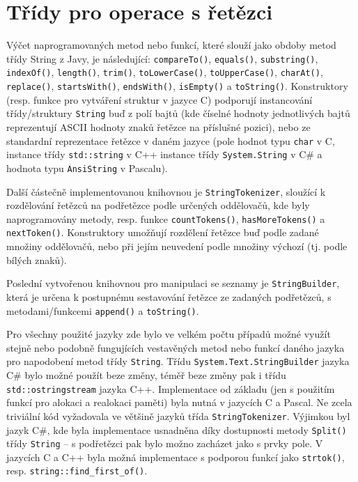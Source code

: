 \documentclass[onepage, a4paper, 12pt]{bakalarka}
\begin{document}
\section{Třídy pro operace s řetězci}
Výčet naprogramovaných metod nebo funkcí, které slouží jako obdoby metod třídy String z Javy, je následující: \texttt{compareTo()}, \texttt{equals()}, \texttt{substring()}, \texttt{indexOf()}, \texttt{length()}, \texttt{trim()}, \texttt{toLowerCase()}, \texttt{toUpperCase()}, \texttt{charAt()}, \texttt{replace()}, \texttt{startsWith()}, \texttt{endsWith()}, \texttt{isEmpty()} a \texttt{toString()}. Konstruktory (resp. funkce pro vytváření struktur v jazyce C) podporují instancování třídy/struktury \texttt{String} buď z polí bajtů (kde číselné hodnoty jednotlivých bajtů reprezentují ASCII hodnoty znaků řetězce na příslušné pozici), nebo ze standardní reprezentace řetězce v daném jazyce (pole hodnot typu \texttt{char} v C, instance třídy \texttt{std::string} v C++ instance třídy \texttt{System.String} v C\# a hodnota typu \texttt{AnsiString} v Pascalu).\par
Další částečně implementovanou knihovnou je \texttt{StringTokenizer}, sloužící k rozdělování řetězců na podřetězce podle určených oddělovačů, kde byly naprogramovány metody, resp. funkce \texttt{countTokens()}, \texttt{hasMoreTokens()} a \texttt{nextToken()}. Konstruktory umožňují rozdělení řetězce buď podle zadané množiny oddělovačů, nebo při jejím neuvedení podle množiny výchozí (tj. podle bílých znaků).\par
Poslední vytvořenou knihovnou pro manipulaci se seznamy je \texttt{StringBuilder}, která je určena k postupnému sestavování řetězce ze zadaných podřetězců, s metodami/funkcemi \texttt{append()} a \texttt{toString()}.\par
Pro všechny použité jazyky zde bylo ve velkém počtu případů možné využít stejně nebo podobně fungujících vestavěných metod nebo funkcí daného jazyka pro napodobení metod třídy \texttt{String}. Třídu \texttt{System.Text.StringBuilder} jazyka C\# bylo možné použít beze změny, téměř beze změny pak i třídu \texttt{std::ostringstream} jazyka C++. Implementace od základu (jen s použitím funkcí pro alokaci a realokaci paměti) byla nutná v jazycích C a Pascal. Ne zcela triviální kód vyžadovala ve většině jazyků třída \texttt{StringTokenizer}. Výjimkou byl jazyk C\#, kde byla implementace usnadněna díky dostupnosti metody \texttt{Split()} třídy \texttt{String} -- s podřetězci pak bylo možno zacházet jako s prvky pole. V jazycích C a C++ byla možná implementace s podporou funkcí jako \texttt{strtok()}, resp. \texttt{string::find\_first\_of()}.
\end{document}
